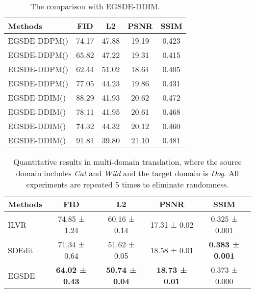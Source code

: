 \documentclass{article}
\begin{document}
\begin{table}[]
\caption{The comparison with EGSDE-DDIM.}
\label{tb : ddim}
\centering
\vspace{.2cm}
\renewcommand\arraystretch{1.2}
\begin{tabular}{lcccc}
\toprule
 Methods      & FID    & L2     & PSNR   & SSIM    \\
\midrule
EGSDE-DDPM()            & 74.17          & 47.88         & 19.19          & 0.423 \\
EGSDE-DDPM() & 65.82  & 47.22  & 19.31  & 0.415\\ EGSDE-DDPM() &62.44 & 51.02   & 18.64 & 0.405\\ EGSDE-DDPM() & 77.05 & 44.23   & 19.86 & 0.431\\ 
\hline
EGSDE-DDIM()    & 88.29 & 41.93 & 20.62  & 0.472 \\

EGSDE-DDIM()    & 78.11 & 41.95 & 20.61  & 0.468 \\
EGSDE-DDIM()    & 74.32 & 44.32 & 20.12  & 0.460 \\
EGSDE-DDIM()    & 91.81 & 39.80 & 21.10  & 0.481 \\
\bottomrule
\end{tabular}
\end{table}



\begin{table}[]
\caption{ Quantitative results in multi-domain translation, where the source domain includes \emph{Cat} and \emph{Wild} and the target domain is \emph{Dog}. All experiments are repeated 5 times to eliminate randomness.}
\label{tb : multi-domain}
\centering
\vspace{.2cm}
\renewcommand\arraystretch{1.2}
\begin{tabular}{lcccc}
\toprule
 Methods      & FID    & L2     & PSNR   & SSIM    \\
\midrule
ILVR~\cite{choi2021ilvr}   & 74.85 ± 1.24 & 60.16 ± 0.14 & 17.31 ± 0.02  & 0.325 ± 0.001 \\
SDEdit~\cite{meng2021sdedit} & 71.34 ± 0.64  & 51.62 ± 0.05 & 18.58 ± 0.01 & \textbf{0.383 ± 0.001 } \\
EGSDE  & \textbf{64.02 ± 0.43} & \textbf{50.74 ± 0.04} & \textbf{18.73 ± 0.01 } & 0.373 ± 0.000 \\
\bottomrule
\end{tabular}
\end{table}
\end{document}
